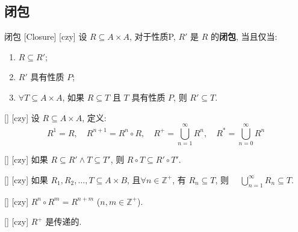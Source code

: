 \documentclass[UTF8]{ctexart}
\begin{document}
    \subsection{闭包}

        \begin{dfn}
            [UUID]
            {闭包}
            [Closure]
            [czy]
            设 \( R \subseteq A \times A \), 对于性质P, \( R' \) 是 \( R \) 的\textbf{闭包}, 当且仅当: 
            \begin{enumerate}
                \item \( R \subseteq R' \);
                \item \( R' \) 具有性质 \(P\); 
                \item \(\forall T \subseteq A \times A \), 如果 \( R \subseteq T \) 且 \( T \) 具有性质 \(P\), 则 \( R' \subseteq T \). 
            \end{enumerate}
        \end{dfn}

        \begin{dfn}
            [UUID]
            {}
            []
            [czy]
            设 \( R \subseteq A \times A \), 定义: 
            \[
            R^1 = R, \quad R^{n+1} = R^n \circ R, \quad R^+ = \bigcup_{n=1}^{\infty} R^n, \quad R^* = \bigcup_{n=0}^{\infty} R^n
            \]
        \end{dfn}

        \begin{lma}
            [UUID]
            {}
            []
            [czy]            
                如果 \( R \subseteq R' \land T \subseteq T' \), 则 \( R \circ T \subseteq R' \circ T' \). 
        \end{lma}

        \begin{lma}
            [UUID]
            {}
            []
            [czy]
                如果 \( R_1, R_2, \ldots, T \subseteq A \times B \), 且\(\forall n \in \mathbb{Z}^+ \), 有 \( R_n \subseteq T \), 则 \( \quad \bigcup_{n=1}^{\infty} R_n \subseteq T \). 
        \end{lma}

        \begin{lma}
            [UUID]
            {}
            []
            [czy]
                \( R^n \circ R^m = R^{n+m} \) (\( n, m \in \mathbb{Z}^+ \)). 
        \end{lma}

        \begin{lma}
            [UUID]
            {}
            []
            [czy]
            \( R^+ \) 是传递的. 
        \end{lma}
\end{document}
